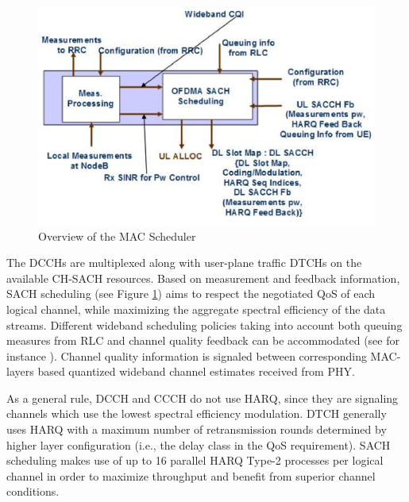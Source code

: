 \documentclass[a4paper,twocolumn,journal]{IEEEtran}
\begin{document}
\begin{figure}
 \includegraphics[width=\columnwidth]{figures/sched}
\caption{Overview of the MAC Scheduler}
\label{fig:scheduling}
\end{figure}

The DCCHs are multiplexed along with user-plane traffic DTCHs on the available CH-SACH resources. Based on measurement and feedback information, SACH scheduling (see Figure \ref{fig:scheduling})  aims to respect the negotiated QoS of each logical channel, while maximizing the aggregate spectral efficiency of the data streams. Different wideband scheduling policies taking into account both queuing measures from RLC and channel quality feedback can be accommodated (see for instance \cite{pap:Realp06}).  Channel quality information is signaled between corresponding MAC-layers based quantized wideband channel estimates received from PHY. 

As a general rule, DCCH and CCCH do not use HARQ, since they are signaling channels which use the lowest spectral efficiency modulation. DTCH generally uses HARQ with a maximum number of retransmission rounds determined by higher layer configuration (i.e., the delay class in the QoS requirement). SACH scheduling makes use of up to 16 parallel HARQ Type-2 processes per logical channel in order to maximize throughput and benefit from superior channel conditions.


\end{document}
